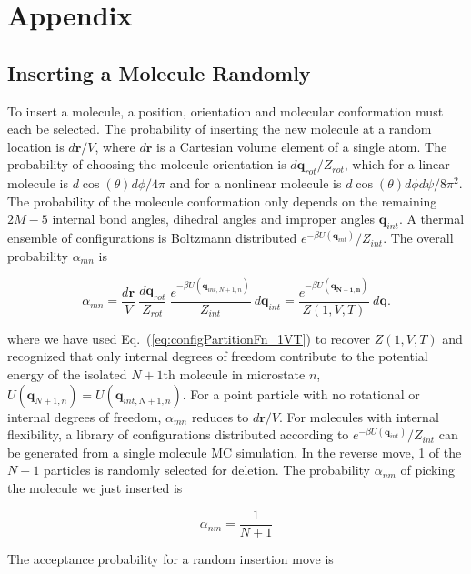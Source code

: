 \section{Appendix}
\label{sec:appendix}
\subsection{Inserting a Molecule Randomly}
\label{sec:randomInsert}
To insert a molecule, a position, orientation and molecular conformation must each be selected. The probability of inserting the new molecule at a random location is $d\mathbf{r}/V$, where $d\mathbf{r}$ is a Cartesian volume element of a single atom. The probability of choosing the molecule orientation is $d\mathbf{q}_{rot}/Z_{rot}$, which for a linear molecule is $d \cos(\theta) d\phi / 4\pi$ and for a nonlinear molecule is $d \cos(\theta)d\phi d\psi/8\pi^2$. The probability of the molecule conformation only depends on the remaining $2M-5$ internal bond angles, dihedral angles and improper angles $\mathbf{q}_{int}$. A thermal ensemble of configurations is Boltzmann distributed $e^{-\beta U(\mathbf{q}_{int})}/Z_{int}$. The overall probability $\alpha_{mn}$ is

\begin{equation}
\label{eq:alpha_randomInsert}
\alpha_{mn} = \frac{d\mathbf{r}}{V}\ \frac{d\mathbf{q}_{rot}}{Z_{rot}}\ \frac{e^{-\beta U(\mathbf{q}_{int,N+1,n})}}{Z_{int}}\ d\mathbf{q}_{int} = \frac{e^{-\beta U(\mathbf{q_{N+1,n}})}}{Z(1,V,T)}\ d\mathbf{q}.
\end{equation}

\noindent
where we have used Eq.\ (\ref{eq:configPartitionFn_1VT}) to recover $Z(1,V,T)$ and recognized that only internal degrees of freedom contribute to the potential energy of the isolated $N+1$th molecule in microstate $n$, $U(\mathbf{q}_{N+1,n}) = U(\mathbf{q}_{int,N+1,n})$. For a point particle with no rotational or internal degrees of freedom, $\alpha_{mn}$ reduces to $d\mathbf{r}/V$. For molecules with internal flexibility, a library of configurations distributed according to $e^{-\beta U(\mathbf{q}_{int})}/Z_{int}$ can be generated from a single molecule MC simulation. In the reverse move, 1 of the $N+1$ particles is randomly selected for deletion. The probability $\alpha_{nm}$ of picking the molecule we just inserted is

\begin{equation}
\alpha_{nm} = \frac{1}{N+1}
\end{equation}

\noindent
The acceptance probability for a random insertion move is 

